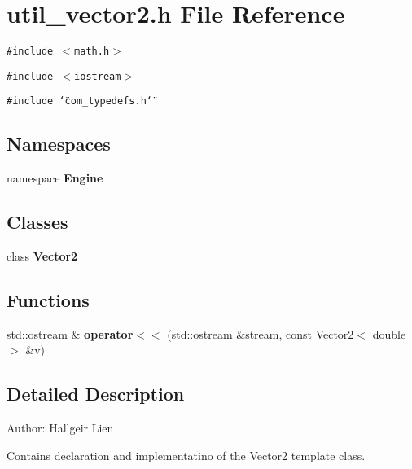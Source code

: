\section{util\_\-vector2.h File Reference}
\label{util__vector2_8h}
{\tt \#include $<$math.h$>$}\par
{\tt \#include $<$iostream$>$}\par
{\tt \#include \char`\"{}com\_\-typedefs.h\char`\"{}}\par
\subsection*{Namespaces}
\begin{CompactItemize}
\item 
namespace {\bf Engine}
\end{CompactItemize}
\subsection*{Classes}
\begin{CompactItemize}
\item 
class {\bf Vector2}
\end{CompactItemize}
\subsection*{Functions}
\begin{CompactItemize}
\item 
std::ostream \& \textbf{operator$<$$<$} (std::ostream \&stream, const Vector2$<$ double $>$ \&v)\label{namespaceEngine_9838854e262b5193014b9c1870e5265d}

\end{CompactItemize}


\subsection{Detailed Description}
\begin{Desc}
\item[Author:]Hallgeir Lien\end{Desc}
Contains declaration and implementatino of the Vector2 template class. 